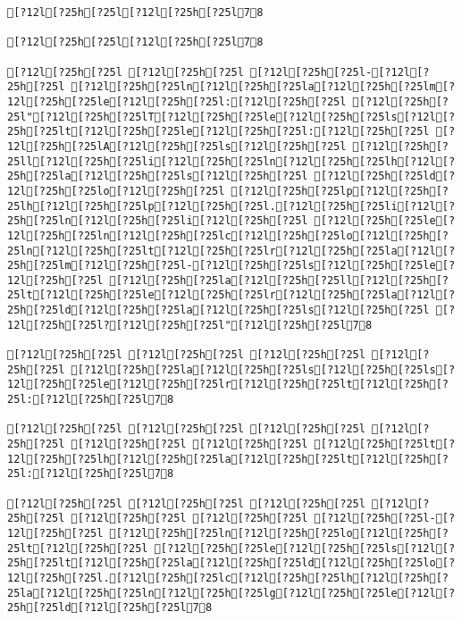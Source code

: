 \documentclass{scrartcl}
\begin{document}
\begin{Verbatim}
[?12l[?25h[?25l[?12l[?25h[?25l78

[?12l[?25h[?25l[?12l[?25h[?25l78

[?12l[?25h[?25l [?12l[?25h[?25l [?12l[?25h[?25l-[?12l[?25h[?25l [?12l[?25h[?25ln[?12l[?25h[?25la[?12l[?25h[?25lm[?12l[?25h[?25le[?12l[?25h[?25l:[?12l[?25h[?25l [?12l[?25h[?25l"[?12l[?25h[?25lT[?12l[?25h[?25le[?12l[?25h[?25ls[?12l[?25h[?25lt[?12l[?25h[?25le[?12l[?25h[?25l:[?12l[?25h[?25l [?12l[?25h[?25lA[?12l[?25h[?25ls[?12l[?25h[?25l [?12l[?25h[?25ll[?12l[?25h[?25li[?12l[?25h[?25ln[?12l[?25h[?25lh[?12l[?25h[?25la[?12l[?25h[?25ls[?12l[?25h[?25l [?12l[?25h[?25ld[?12l[?25h[?25lo[?12l[?25h[?25l [?12l[?25h[?25lp[?12l[?25h[?25lh[?12l[?25h[?25lp[?12l[?25h[?25l.[?12l[?25h[?25li[?12l[?25h[?25ln[?12l[?25h[?25li[?12l[?25h[?25l [?12l[?25h[?25le[?12l[?25h[?25ln[?12l[?25h[?25lc[?12l[?25h[?25lo[?12l[?25h[?25ln[?12l[?25h[?25lt[?12l[?25h[?25lr[?12l[?25h[?25la[?12l[?25h[?25lm[?12l[?25h[?25l-[?12l[?25h[?25ls[?12l[?25h[?25le[?12l[?25h[?25l [?12l[?25h[?25la[?12l[?25h[?25ll[?12l[?25h[?25lt[?12l[?25h[?25le[?12l[?25h[?25lr[?12l[?25h[?25la[?12l[?25h[?25ld[?12l[?25h[?25la[?12l[?25h[?25ls[?12l[?25h[?25l [?12l[?25h[?25l?[?12l[?25h[?25l"[?12l[?25h[?25l78

[?12l[?25h[?25l [?12l[?25h[?25l [?12l[?25h[?25l [?12l[?25h[?25l [?12l[?25h[?25la[?12l[?25h[?25ls[?12l[?25h[?25ls[?12l[?25h[?25le[?12l[?25h[?25lr[?12l[?25h[?25lt[?12l[?25h[?25l:[?12l[?25h[?25l78

[?12l[?25h[?25l [?12l[?25h[?25l [?12l[?25h[?25l [?12l[?25h[?25l [?12l[?25h[?25l [?12l[?25h[?25l [?12l[?25h[?25lt[?12l[?25h[?25lh[?12l[?25h[?25la[?12l[?25h[?25lt[?12l[?25h[?25l:[?12l[?25h[?25l78

[?12l[?25h[?25l [?12l[?25h[?25l [?12l[?25h[?25l [?12l[?25h[?25l [?12l[?25h[?25l [?12l[?25h[?25l [?12l[?25h[?25l-[?12l[?25h[?25l [?12l[?25h[?25ln[?12l[?25h[?25lo[?12l[?25h[?25lt[?12l[?25h[?25l [?12l[?25h[?25le[?12l[?25h[?25ls[?12l[?25h[?25lt[?12l[?25h[?25la[?12l[?25h[?25ld[?12l[?25h[?25lo[?12l[?25h[?25l.[?12l[?25h[?25lc[?12l[?25h[?25lh[?12l[?25h[?25la[?12l[?25h[?25ln[?12l[?25h[?25lg[?12l[?25h[?25le[?12l[?25h[?25ld[?12l[?25h[?25l78


\end{Verbatim}
\end{document}
